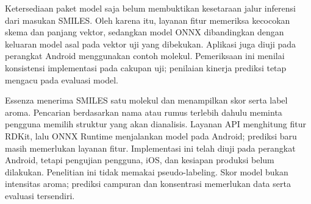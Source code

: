 Ketersediaan paket model saja belum membuktikan kesetaraan jalur inferensi dari masukan SMILES. Oleh karena itu, layanan fitur memeriksa kecocokan skema dan panjang vektor, sedangkan model ONNX dibandingkan dengan keluaran model asal pada vektor uji yang dibekukan. Aplikasi juga diuji pada perangkat Android menggunakan contoh molekul. Pemeriksaan ini menilai konsistensi implementasi pada cakupan uji; penilaian kinerja prediksi tetap mengacu pada evaluasi model.

Essenza menerima SMILES satu molekul dan menampilkan skor serta label aroma. Pencarian berdasarkan nama atau rumus terlebih dahulu meminta pengguna memilih struktur yang akan dianalisis. Layanan API menghitung fitur RDKit, lalu ONNX Runtime menjalankan model pada Android; prediksi baru masih memerlukan layanan fitur. Implementasi ini telah diuji pada perangkat Android, tetapi pengujian pengguna, iOS, dan kesiapan produksi belum dilakukan. Penelitian ini tidak memakai pseudo-labeling. Skor model bukan intensitas aroma; prediksi campuran dan konsentrasi memerlukan data serta evaluasi tersendiri.
